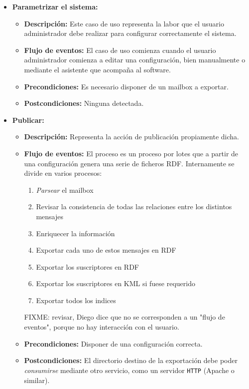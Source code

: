 \begin{itemize}

  \item \textbf{Parametrizar el sistema:}
 	\begin{itemize}
 	  \item \textbf{Descripción:} Este caso de uso representa la labor 
		que el usuario administrador debe realizar para configurar 
		correctamente el sistema.
 	  \item \textbf{Flujo de eventos:} El caso de uso comienza cuando el
		usuario administrador comienza a editar una configuración, 
		bien manualmente o mediante el asistente que acompaña al 
		software.
	  \item \textbf{Precondiciones:} Es necesario disponer de un mailbox
		a exportar.
	  \item \textbf{Postcondiciones:} Ninguna detectada.
	\end{itemize}

  \item \textbf{Publicar:}
 	\begin{itemize}
 	  \item \textbf{Descripción:} Representa la acción de publicación 
		propiamente dicha.
 	  \item \textbf{Flujo de eventos:} El proceso es un proceso por 
		lotes que a partir de una configuración genera una serie 
		de ficheros RDF. Internamente se divide en varios procesos:
		\begin{enumerate}
		 \item \emph{Parsear} el mailbox
		 \item Revisar la consistencia de todas las relaciones entre los distintos mensajes
		 \item Enriquecer la información
		 \item Exportar cada uno de estos mensajes en RDF
		 \item Exportar los suscriptores en RDF
		 \item Exportar los suscriptores en KML si fuese requerido
		 \item Exportar todos los indices
		\end{enumerate}
		FIXME: revisar, Diego dice que no se corresponden a un "flujo de eventos", 
		porque no hay interacción con el usuario.
	  \item \textbf{Precondiciones:} Disponer de una configuración correcta.
	  \item \textbf{Postcondiciones:} El directorio destino de la exportación
		debe poder \emph{consumirse} mediante otro servicio, como un 
		servidor \texttt{HTTP} (Apache o similar).
	\end{itemize}


\end{itemize}
